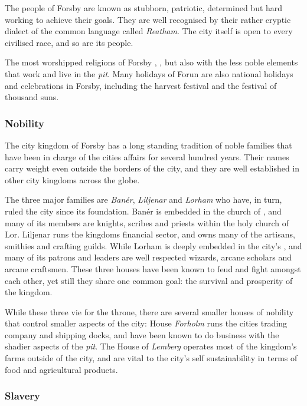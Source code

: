 The people of Forsby are known as stubborn, patriotic, determined but hard
working to achieve their goals. They are well recognised by their rather
cryptic dialect of the common language called \emph{Reatham}. The city itself
is open to every civilised race, and so are its people.

The most worshipped religions of Forsby ,
, but also  with the less noble elements
that work and live in the \emph{pit}. Many holidays of Forun are also national
holidays and celebrations in Forsby, including the harvest festival and the
festival of thousand suns.

\subsubsection{Nobility}

The city kingdom of Forsby has a long standing tradition of noble
families that have been in charge of the cities affairs for several hundred
years. Their names carry weight even outside the borders of the city, and
they are well established in other city kingdoms across the globe.

The three major families are \emph{Banér}, \emph{Liljenar} and \emph{Lorham}
who have, in turn, ruled the city since its foundation. Banér is embedded in the
church of , and many of its members are knights, scribes and
priests within the holy church of Lor. Liljenar runs the kingdoms financial
sector, and owns many of the artisans, smithies and crafting guilds. While
Lorham is deeply embedded in the city's , and
many of its patrons and leaders are well respected wizards, arcane scholars
and arcane craftsmen.  These three houses have been known to feud and fight
amongst each other, yet still they share one common goal: the survival and
prosperity of the kingdom.

While these three vie for the throne, there are several smaller houses of
nobility that control smaller aspects of the city: House \emph{Forholm} runs
the cities trading company and shipping docks, and have been known to do
business with the shadier aspects of the \emph{pit}. The House of
\emph{Lemberg} operates most of the kingdom's farms outside of the city, and
are vital to the city's self sustainability in terms of food and agricultural
products.

\subsubsection{Slavery}

